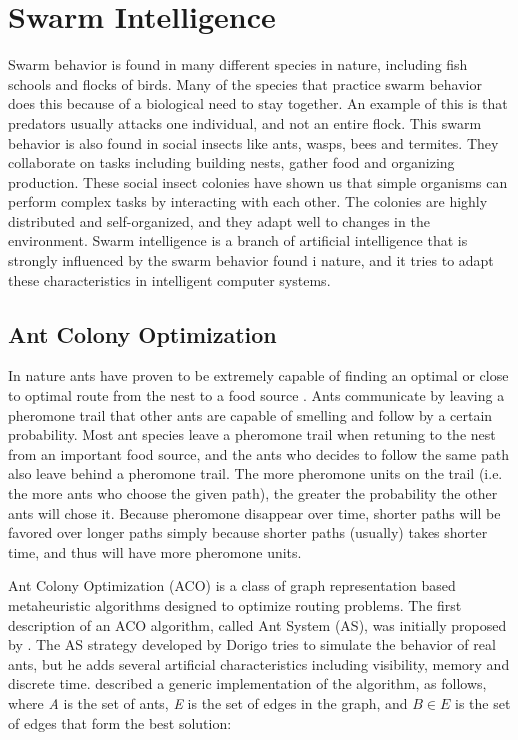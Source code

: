 \section{Swarm Intelligence}

Swarm behavior is found in many different species in nature, including fish schools and flocks of birds. Many of the species that practice swarm behavior does this because of a biological need to stay together. An example of this is that predators usually attacks one individual, and not an entire flock. This swarm behavior is also found in social insects like ants, wasps, bees and termites. They collaborate on tasks including building nests, gather food and organizing production. These social insect colonies have shown us that simple organisms can perform complex tasks by interacting with each other. The colonies are highly distributed and self-organized, and they adapt well to changes in the environment. Swarm intelligence \citep{beni89} is a branch of artificial intelligence that is strongly influenced by the swarm behavior found i nature, and it tries to adapt these characteristics in intelligent computer systems.

\subsection{Ant Colony Optimization}
In nature ants have proven to be extremely capable of finding an optimal or close to optimal route from the nest to a food source \citep{deneubourg90}. Ants communicate by leaving a pheromone trail that other ants are capable of smelling and follow by a certain probability. Most ant species leave a pheromone trail when retuning to the nest from an important food source, and the ants who decides to follow the same path also leave behind a pheromone trail. The more pheromone units on the trail (i.e. the more ants who choose the given path), the greater the probability the other ants will chose it. Because pheromone disappear over time, shorter paths will be favored over longer paths simply because shorter paths (usually) takes shorter time, and thus will have more pheromone units. 

Ant Colony Optimization (ACO) is a class of graph representation based metaheuristic algorithms designed to optimize routing problems. The first description of an ACO algorithm, called Ant System (AS), was initially proposed by \citet{dorigo96}. The AS strategy developed by Dorigo tries to simulate the behavior of real ants, but he adds several artificial characteristics including visibility, memory and discrete time. \citet{nanda11} described a generic implementation of the algorithm, as follows, where \textit{A} is the set of ants, \textit{E} is the set of edges in the graph, and $B \in E$ is the set of edges that form the best solution: \\

